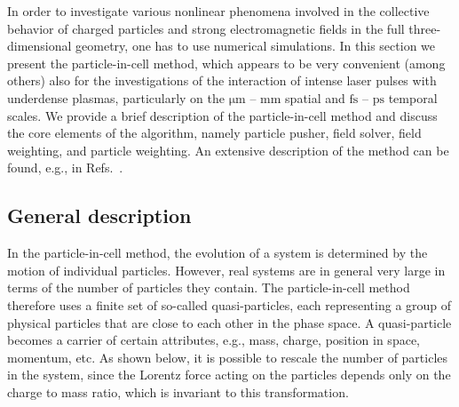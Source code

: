 \documentclass[10pt, a4paper, twoside, openright]{report}
\begin{document}



In order to investigate various nonlinear phenomena involved in the collective behavior of charged particles and strong electromagnetic fields in the full three-dimensional geometry, one has to use numerical simulations. In this section we present the particle-in-cell method, which appears to be very convenient (among others) also for the investigations of the interaction of intense laser pulses with underdense plasmas, particularly on the $ \mathrm{\mu m} $ -- $ \mathrm{mm} $ spatial and $ \mathrm{fs} $ -- $ \mathrm{ps} $ temporal scales. We provide a brief description of the particle-in-cell method and discuss the core elements of the algorithm, namely particle pusher, field solver, field weighting, and particle weighting. An extensive description of the method can be found, e.g., in Refs.~.

\subsection{General description}

In the particle-in-cell method, the evolution of a system is determined by the motion of individual particles. However, real systems are in general very large in terms of the number of particles they contain. The particle-in-cell method therefore uses a finite set of so-called quasi-particles, each representing a group of physical particles that are close to each other in the phase space. A quasi-particle becomes a carrier of certain attributes, e.g., mass, charge, position in space, momentum, etc. As shown below, it is possible to rescale the number of particles in the system, since the Lorentz force acting on the particles depends only on the charge to mass ratio, which is invariant to this transformation. 
\end{document}
